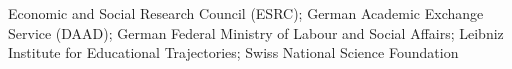 Economic and Social Research Council (ESRC); German Academic Exchange Service (DAAD); German Federal Ministry of Labour and Social Affairs; Leibniz Institute for Educational Trajectories; Swiss National Science Foundation%

